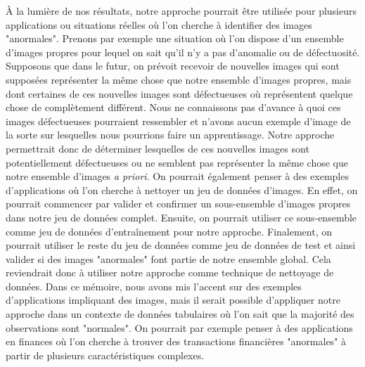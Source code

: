 À la lumière de nos résultats, notre approche pourrait être utilisée pour plusieurs applications ou situations réelles où l'on cherche à identifier des images "anormales". Prenons par exemple une situation où l'on dispose d'un ensemble d'images propres pour lequel on sait qu'il n'y a pas d'anomalie ou de défectuosité. Supposons que dans le futur, on prévoit recevoir de nouvelles images qui sont supposées représenter la même chose que notre ensemble d'images propres, mais dont certaines de ces nouvelles images sont défectueuses où représentent quelque chose de complètement différent. Nous ne connaissons pas d'avance à quoi ces images défectueuses pourraient ressembler et n'avons aucun exemple d'image de la sorte sur lesquelles nous pourrions faire un apprentissage. Notre approche permettrait donc de déterminer lesquelles de ces nouvelles images sont potentiellement défectueuses ou ne semblent pas représenter la même chose que notre ensemble d'images \textit{a priori}. On pourrait également penser à des exemples d'applications où l'on cherche à nettoyer un jeu de données d'images. En effet, on pourrait commencer par valider et confirmer un sous-ensemble d'images propres dans notre jeu de données complet. Ensuite, on pourrait utiliser ce sous-ensemble comme jeu de données d'entraînement pour notre approche. Finalement, on pourrait utiliser le reste du jeu de données comme jeu de données de test et ainsi valider si des images "anormales" font partie de notre ensemble global. Cela reviendrait donc à utiliser notre approche comme technique de nettoyage de données. Dans ce mémoire, nous avons mis l'accent sur des exemples d'applications impliquant des images, mais il serait possible d'appliquer notre approche dans un contexte de données tabulaires où l'on sait que la majorité des observations sont "normales". On pourrait par exemple penser à des applications en finances où l'on cherche à trouver des transactions financières "anormales" à partir de plusieurs caractéristiques complexes.


